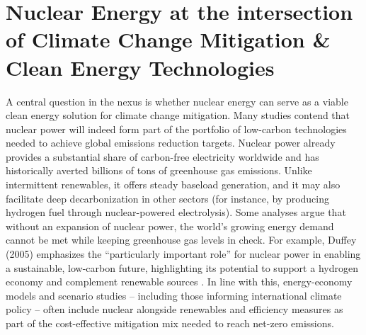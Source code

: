 \documentclass[11,5 pt]{article}
\begin{document}
\section{Nuclear Energy at the intersection of Climate Change Mitigation \& Clean Energy Technologies}


A central question in the nexus is whether nuclear energy can serve as a viable clean energy solution for climate change mitigation. Many studies contend that nuclear power will indeed form part of the portfolio of low-carbon technologies needed to achieve global emissions reduction targets. Nuclear power already provides a substantial share of carbon-free electricity worldwide and has historically averted billions of tons of greenhouse gas emissions. Unlike intermittent renewables, it offers steady baseload generation, and it may also facilitate deep decarbonization in other sectors (for instance, by producing hydrogen fuel through nuclear-powered electrolysis). Some analyses argue that without an expansion of nuclear power, the world’s growing energy demand cannot be met while keeping greenhouse gas levels in check. For example, Duffey (2005) emphasizes the “particularly important role” for nuclear power in enabling a sustainable, low-carbon future, highlighting its potential to support a hydrogen economy and complement renewable sources \cite{DUFFEY2005535}. In line with this, energy-economy models and scenario studies – including those informing international climate policy – often include nuclear alongside renewables and efficiency measures as part of the cost-effective mitigation mix needed to reach net-zero emissions.
\end{document}
